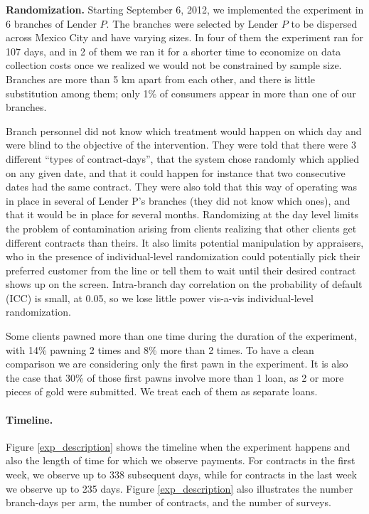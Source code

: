 \documentclass[oneside,11pt]{article}
\begin{document}
\vspace{.2in}
\noindent \textbf{Randomization.}  Starting September 6, 2012, we implemented the experiment in 6 branches of Lender $P$. The branches were selected by Lender $P$ to be dispersed across Mexico City and have varying sizes. In four of them the experiment ran for 107 days, and in 2 of them we ran it for a shorter time to economize on data collection costs once we realized we would not be constrained by sample size. %
Branches are more than 5 km apart from each other, and there is little substitution among them; only 1\% of consumers appear in more than one of our branches.

Branch personnel did not know which treatment would happen on which day and were blind to the objective of the intervention. They were told that there were 3 different ``types of contract-days'', that the system chose randomly which applied on any given date, and that it could happen for instance that two consecutive dates had the same contract. They were also told that this way of operating was in place in several of Lender P's branches (they did not know which ones), and that it would be in place for several months. Randomizing at the day level limits the problem of contamination arising from clients realizing that other clients get different contracts than theirs. It also limits potential manipulation by appraisers, who in the presence of individual-level randomization could potentially pick their preferred customer from the line or tell them to wait until their desired contract shows up on the screen. Intra-branch day correlation on the probability of default (ICC) is small, at {0.05}, so we lose little power vis-a-vis individual-level randomization.



Some clients pawned more than one time during the duration of the experiment, with 14\% pawning 2 times and 8\% more than 2 times. To have a clean comparison we are considering only the first pawn in the experiment. It is also the case that 30\% of those first pawns involve more than 1 loan, as 2 or more pieces of gold were submitted. We treat each of them as separate loans.


\paragraph{Timeline.} Figure \ref{exp_description} shows the timeline when the experiment happens and also the length of time for which we observe payments. For contracts in the first week, we observe up to 338 subsequent days, while for contracts in the last week we observe up to 235 days. Figure \ref{exp_description} also illustrates the number branch-days per arm, the number of contracts, and the number of surveys. %
\end{document}

